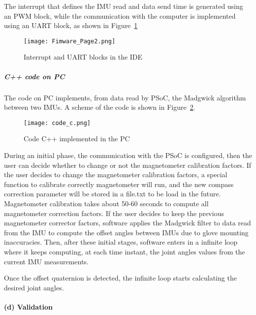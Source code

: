 \begin{enumerate}
\noindent The interrupt that defines the IMU read and data send time is generated using an PWM block, while the communication with the computer is implemented using an UART block, as shown in Figure~\ref{fig:firmwarepage1}


\begin{figure}[h]
\centering
\texttt{[image: Fimware\_Page2.png]}
\caption{Interrupt and UART blocks in the IDE}
\label{fig:firmwarepage1}
\end{figure}
\end{enumerate}

\subparagraph{C++ code on PC}
The code on PC implements, from data read by PSoC, the Madgwick algorithm between two IMUs. A scheme of the code is shown in Figure~\ref{fig:code_c}.

\begin{figure}[h]
\centering
\texttt{[image: code\_c.png]}
\caption{Code C++ implemented in the PC}
\label{fig:code_c}
\end{figure}

During an initial phase, the communication with the PSoC is configured, then the user can decide whether to change or not the magnetometer calibration factors. If the user decides to change the magnetometer calibration factors, a special function
to calibrate correctly magnetometer will run, and the new compass correction parameter will be stored in a file.txt to be load in the future. Magnetometer calibration takes about 50-60 seconds to compute all magnetometer correction factors.
If the user decides to keep the previous magnetometer corrector factors, software applies the Madgwick filter to data read from the IMU to compute the offset angles between IMUs due to glove mounting inaccuracies. Then, after these initial stages, software enters in a infinite loop where it keeps computing, at each time instant, the joint angles values from the current IMU measurements.

Once the offset quaternion is detected, the infinite loop starts calculating the desired joint angles.

\paragraph{(d) Validation}

